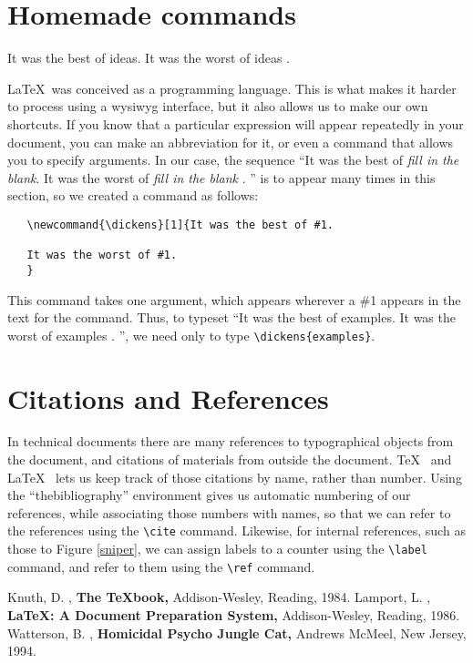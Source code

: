 \documentclass[12pt]{article}
\begin{document}
\section{Homemade commands}
\newcommand{\dickens}[1]{It was the best of #1.
It was the worst of #1
.
}
\dickens{ideas}
\LaTeX\ was conceived as a programming language.
This is what makes it
harder to process using a wysiwyg interface, but it also allows
us to make our own shortcuts.
If you know that a particular expression will appear repeatedly
in your document, you can make an abbreviation for it, or even
a command that allows you to specify arguments.
In our case,
the sequence ``\dickens{{\it fill in the blank}}''
is to appear many times in this section, so we created a command
as follows:
\begin{verbatim}
   \newcommand{\dickens}[1]{It was the best of #1.

   It was the worst of #1.
   }
\end{verbatim}
This command takes one argument, which appears wherever a \#1 appears
in the text for the command.
Thus, to typeset ``\dickens{examples}'',
we need only to type \verb(\dickens{examples}(.

\section{Citations and References}
In technical documents there are many references to 
typographical objects from the document, and citations
of materials from outside the document.
\TeX\ \cite{knuth}
and \LaTeX\ \cite{lamport} lets us keep track of those citations
by name, rather than number.
Using the ``thebibliography'' 
environment gives us automatic numbering of our references,
while associating those numbers with names, so that we can
refer to the references using the \verb(\cite( command.
Likewise, for internal references, such as those to Figure \ref{sniper},
we can assign labels to a counter using the \verb(\label(
command, and refer to them using the \verb(\ref( command.

\begin{thebibliography}{X}
    Knuth, D.
   , {\bf The \TeX book,} Addison-Wesley, Reading, 1984.
    Lamport, L.
   , {\bf \LaTeX: A Document Preparation System,}
   Addison-Wesley, Reading, 1986.
    Watterson, B.
   , {\bf Homicidal Psycho Jungle Cat,}
   Andrews McMeel, New Jersey, 1994.
\end{thebibliography}
\end{document}
